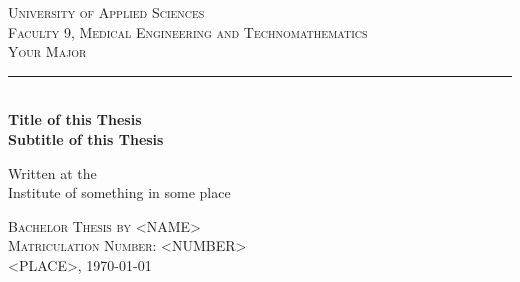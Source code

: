 \begin{titlepage}

	\begin{center}
	\textsc{\Large University of Applied Sciences}	\\
	\textsc{\large Faculty 9, Medical Engineering and Technomathematics} \\
	\textsc{Your Major}

	\vspace{150pt}

	\newcommand{\HRule}{\rule{\linewidth}{0.5mm}}
	\HRule \\ [0.4cm]
	
	{\huge \bfseries Title of this Thesis} \\
	[0.2cm]
	{\Large \bfseries Subtitle of this Thesis} \\
	
	\vspace{60pt}
	
	{\Large Written at the \\ Institute of something in some place}
	
	\vspace{90pt}
	\large
	\textsc{Bachelor Thesis by <NAME>} \\
	\textsc{Matriculation Number: <NUMBER>} \\
	\textsc{<PLACE>, \today}
	
	\end{center}
\end{titlepage}